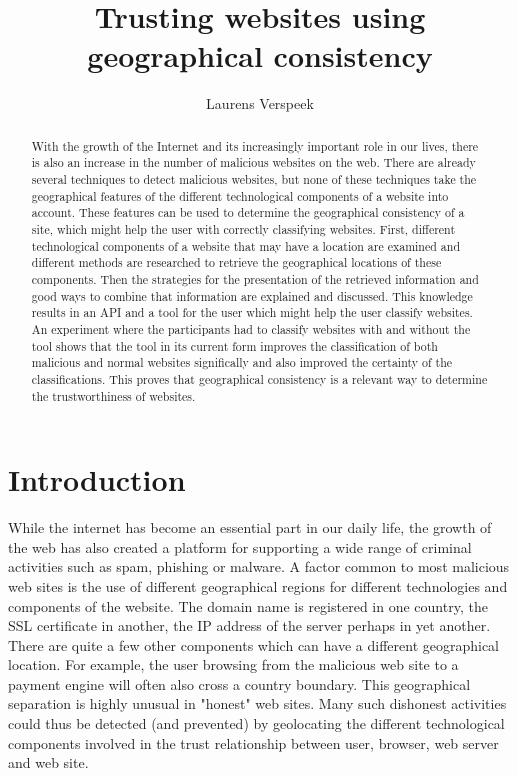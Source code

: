 \documentclass[twoside,openright,notitlepage]{uva-bachelor-thesis}
\title{Trusting websites using geographical consistency}
\author{Laurens Verspeek}
\begin{document}
\maketitle

\begin{abstract}
With the growth of the Internet and its increasingly important role in our lives, there is also an increase in the number of malicious websites on the web. There are already several techniques to detect malicious websites, but none of these techniques take the geographical features of the different technological components of a website into account. These features can be used to determine the geographical consistency of a site, which might help the user with correctly classifying websites. First, different technological components of a website that may have a location are examined and different methods are researched to retrieve the geographical locations of these components. Then the strategies for the presentation of the retrieved information and good ways to combine that information are explained and discussed. This knowledge results in an API and a tool for the user which might help the user classify websites. An experiment where the participants had to classify websites with and without the tool shows that the tool in its current form improves the classification of both malicious and normal websites significally and also improved the certainty of the classifications. This proves that geographical consistency is a relevant way to determine the trustworthiness of websites.
\end{abstract}

\tableofcontents

\chapter{Introduction}
While the internet has become an essential part in our daily life, the growth of the web has also created a platform for supporting a wide range of criminal activities such as spam, phishing or malware. A factor common to most malicious web sites is the use of different geographical regions for different technologies and components of the website. The domain name is registered in one country, the SSL certificate in another, the IP address of the server perhaps in yet another. There are quite a few other components which can have a different geographical location. For example, the user browsing from the malicious web site to a payment engine will often also cross a country boundary. This geographical separation is highly unusual in "honest" web sites. Many such dishonest activities could thus be detected (and prevented) by geolocating the different technological components involved in the trust relationship between user, browser, web server and web site.
\end{document}
